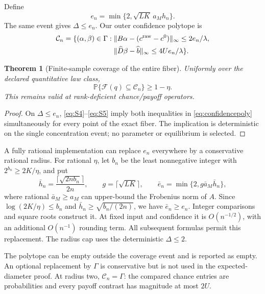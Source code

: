 \documentclass[11pt,a4paper]{article}
\numberwithin{equation}{section}
\newtheorem{theorem}{Theorem}
\theoremstyle{definition}
\newcommand{\Prob}{\mathbb P}
\begin{document}
Define
\begin{equation}\label{eq:S9}
 e_n=\min\{2,\sqrt{LK}\,a_Mh_n\}.
\end{equation}
The same event gives \(\Delta\le e_n\).
Our outer confidence polytope is
\begin{equation}\label{eq:confidencepoly}
 \begin{split}
 \mathcal C_n=\{(\alpha,\beta)\in\Gamma:\;&
  \|B\alpha-(c^{\rm raw}-c^0)\|_\infty\le2e_n/\lambda,\\
 &\|\widehat D\beta-\widehat b\|_\infty\le4Ue_n/\lambda\}.
 \end{split}
\end{equation}

\begin{theorem}[Finite-sample coverage of the entire fiber]
\label{thm:confidence}
Uniformly over the declared quantitative law class,
\begin{equation}\label{eq:S10}
 \Prob\{\mathcal F(q)\subseteq\mathcal C_n\}\ge1-\eta .
\end{equation}
This remains valid at rank-deficient chance/payoff operators.
\end{theorem}
\begin{proof}
On \(\Delta\le e_n\), \eqref{eq:S4}--\eqref{eq:S5} imply both
inequalities in \eqref{eq:confidencepoly} simultaneously for every
point of the exact fiber. The implication is deterministic on the
single concentration event; no parameter or equilibrium is selected.
\end{proof}

A fully rational implementation can replace \(e_n\) everywhere by
a conservative rational radius. For rational \(\eta\), let \(b_n\)
be the least nonnegative integer with \(2^{b_n}\ge2K/\eta\), and put
\begin{equation}\label{eq:rationalradius}
 \bar h_n=\frac{\lceil\sqrt{2nb_n}\rceil}{2n},\qquad
 g=\lceil\sqrt{LK}\rceil,\qquad
 \bar e_n=\min\{2,g\bar a_M\bar h_n\},
\end{equation}
where rational \(\bar a_M\ge a_M\) can upper-bound the Frobenius norm
of \(A\). Since \(\log(2K/\eta)\le b_n\) and
\(\bar h_n\ge\sqrt{b_n/(2n)}\), we have \(\bar e_n\ge e_n\).
Integer comparisons and square roots construct it. At fixed input
and confidence it is \(O(n^{-1/2})\), with an additional
\(O(n^{-1})\) rounding term. All subsequent formulas permit this
replacement. The radius cap uses the deterministic \(\Delta\le2\).

The polytope can be empty outside the coverage event and is reported
as empty.
An optional replacement by \(\Gamma\) is conservative but is not
used in the expected-diameter proof. At radius two,
\(\mathcal C_n=\Gamma\): the compared chance entries are probabilities
and every payoff contrast has magnitude at most \(2U\).
\end{document}
